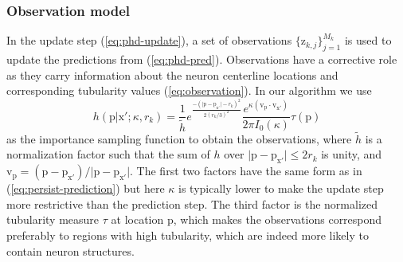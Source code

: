 \documentclass[noinfo,nocrop,final]{bioinfo}
\begin{document}
\subsubsection{Observation model}
\label{sssec:observation-model}
In the update step (\ref{eq:phd-update}), a set of observations $\{\mathrm{z}_{k,j}\}_{j=1}^{M_k}$ is used to update the predictions from (\ref{eq:phd-pred}). Observations have a corrective role as they carry information about the neuron centerline locations and corresponding tubularity values (\ref{eq:observation}). In our algorithm we use
\begin{equation}
\label{eq:observation-importance-sampling}
h(\mathrm{p} | \mathrm{x'}; \kappa, r_k) = \frac{1}{\tilde{h}} e^{\frac{ -(\vert \mathrm{p} - \mathrm{p}_{\mathrm{x'}}  \vert - r_k)^2  }{2 (r_k/3)^2}} \frac{e^{\kappa (\mathrm{v}_{\mathrm{p}} \cdot \mathrm{v}_{\mathrm{x'}})}}{2 \pi I_0(\kappa)} \tau(\mathrm{p})
\end{equation}
as the importance sampling function to obtain the observations, where $\tilde{h}$ is a normalization factor such that the sum of $h$ over $\vert \mathrm{p} - \mathrm{p}_{\mathrm{x'}} \vert \leq 2r_k$ is unity, and $\mathrm{v}_{\mathrm{p}}=(\mathrm{p}-\mathrm{p}_{\mathrm{x'}})/\vert \mathrm{p}-\mathrm{p}_{\mathrm{x'}}\vert$. The first two factors have the same form as in (\ref{eq:persist-prediction}) but here $\kappa$ is typically lower to make the update step more restrictive than the prediction step. The third factor is the normalized tubularity measure $\tau$ \citep{Sato-1998} at location $\mathrm{p}$, which makes the observations correspond preferably to regions with high tubularity, which are indeed more likely to contain neuron structures.
\end{document}
